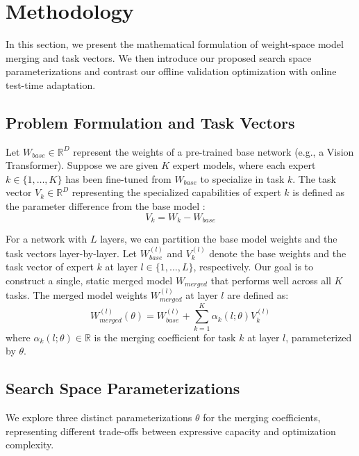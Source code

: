 \section{Methodology}
\label{sec:method}

In this section, we present the mathematical formulation of weight-space model merging and task vectors. We then introduce our proposed search space parameterizations and contrast our offline validation optimization with online test-time adaptation.

\subsection{Problem Formulation and Task Vectors}
Let $W_{base} \in \mathbb{R}^D$ represent the weights of a pre-trained base network (e.g., a Vision Transformer). Suppose we are given $K$ expert models, where each expert $k \in \{1, \dots, K\}$ has been fine-tuned from $W_{base}$ to specialize in task $k$. The task vector $V_k \in \mathbb{R}^D$ representing the specialized capabilities of expert $k$ is defined as the parameter difference from the base model \cite{ilharco2022editing}:
\begin{equation}
V_k = W_k - W_{base}
\end{equation}

For a network with $L$ layers, we can partition the base model weights and the task vectors layer-by-layer. Let $W_{base}^{(l)}$ and $V_k^{(l)}$ denote the base weights and the task vector of expert $k$ at layer $l \in \{1, \dots, L\}$, respectively.
Our goal is to construct a single, static merged model $W_{merged}$ that performs well across all $K$ tasks. The merged model weights $W_{merged}^{(l)}$ at layer $l$ are defined as:
\begin{equation}
W_{merged}^{(l)}(\theta) = W_{base}^{(l)} + \sum_{k=1}^K \alpha_k(l; \theta) V_k^{(l)}
\end{equation}
where $\alpha_k(l; \theta) \in \mathbb{R}$ is the merging coefficient for task $k$ at layer $l$, parameterized by $\theta$.

\subsection{Search Space Parameterizations}
We explore three distinct parameterizations $\theta$ for the merging coefficients, representing different trade-offs between expressive capacity and optimization complexity.

